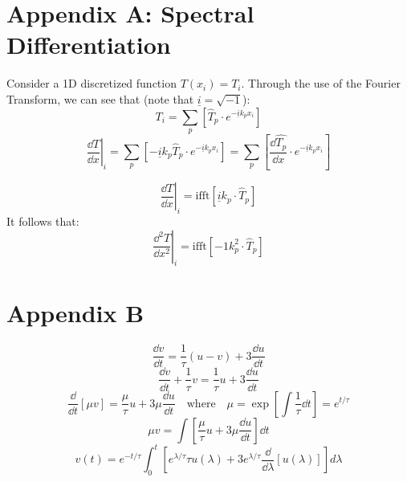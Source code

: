\documentclass[10pt, reqno]{amsart}
\begin{document}
\begin{multicols}{2}
\section*{Appendix A: Spectral Differentiation}
Consider a 1D discretized function $T(x_i) = T_i$. Through the use of the Fourier Transform, we can see that (note that $\underline{i} = \sqrt{-1}$):
\[ T_i = \sum_p \left[ \hat{T}_p \cdot e^{- \underline{i} k_p x_i} \right] \]
\[ \left. \frac{\dd T}{\dd x} \right|_i = \sum_p \left[- \underline{i} k_p \hat{T}_p \cdot e^ {- \underline{i} k_p x_i} \right] = \sum_p \left[ \frac{\dd  \hat{T_p}}{\dd x} \cdot e^ {- \underline{i} k_p x_i} \right] \]

\[ \left. \frac{\dd T}{\dd x} \right|_i = \text{ifft} \left[ \underline{i} k_p \cdot \hat{T}_p \right] \]
It follows that:
\[ \left. \frac{\dd ^2T}{\dd x^2} \right|_i = \text{ifft} \left[ -1 k_p^2 \cdot \hat{T}_p \right ] \]

\section*{Appendix B}
\[ \frac{\dd v}{\dd t} = \frac{1}{\tau} (u - v) + 3 \frac{\dd u}{\dd t} \]
\[ \frac{\dd v}{\dd t} + \frac{1}{\tau} v = \frac{1}{\tau} u + 3 \frac{\dd u}{\dd t} \]
\[ \frac{\dd}{\dd t} \left[ \mu v \right] = \frac{\mu}{\tau} u + 3 \mu \frac{\dd u}{\dd t} \quad \mathrm{ where } \quad \mu = \exp \left[ \int \frac{1}{\tau} \dd t \right] = e^{t/\tau} \]
\[ \mu v = \int \left[ \frac{\mu}{\tau} u + 3 \mu \frac{\dd u}{\dd t} \right] \dd t \]
\[ v(t) = e^{-t/\tau} \int_0^t \left[ e^{\lambda / \tau}{\tau} u(\lambda) + 3e^{\lambda / \tau} \frac{\dd}{\dd \lambda} \left[ u(\lambda) \right] \right] d \lambda \]
\end{multicols}
\end{document}

